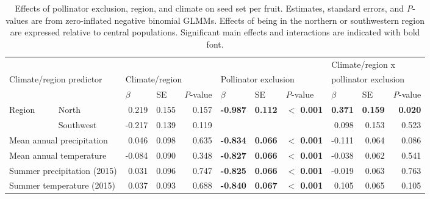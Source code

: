 \documentclass{article}
\begin{document}
\begin{table}[p]
\centering
\caption[Effects of pollinator exclusion, region, and climate on seed set per fruit.]{Effects of pollinator exclusion, region, and climate on seed set per fruit. Estimates, standard errors, and \textit{P}-values are from zero-inflated negative binomial GLMMs. Effects of being in the northern or southwestern region are expressed relative to central populations. Significant main effects and interactions are indicated with bold font.}
\label{seedstable}
\small
\begin{tabular}{llrrrrrrrrr}
\toprule
                            &                     &  & &                        &  &  &   & \multicolumn{3}{l}{Climate/region x}           \\
\multicolumn{2}{l}{Climate/region predictor}          & \multicolumn{3}{l}{Climate/region} &    \multicolumn{3}{l}{Pollinator exclusion}                               & \multicolumn{3}{l}{pollinator exclusion} \\
                            &                     & \multicolumn{1}{l}{$\beta$} & \multicolumn{1}{l}{SE} & \multicolumn{1}{l}{\textit{P}-value} &  \multicolumn{1}{l}{$\beta$}  & \multicolumn{1}{l}{SE} &  \multicolumn{1}{l}{\textit{P}-value} &  \multicolumn{1}{l}{$\beta$}  & \multicolumn{1}{l}{SE} &  \multicolumn{1}{l}{\textit{P}-value} \\
\midrule
Region     & North               & 0.219    & 0.155    & 0.157       & \textbf{-0.987} & \textbf{0.112} & \textbf{$<$ 0.001} & \textbf{0.371} & \textbf{0.159} & \textbf{0.020} \\
                            & Southwest           & -0.217   & 0.139    & 0.119       &        &       &                         & 0.098        & 0.153      & 0.523        \\
\midrule
\multicolumn{2}{l}{Mean annual precipitation}     & 0.046    & 0.098    & 0.635       & \textbf{-0.834} & \textbf{0.066} & \textbf{$<$ 0.001}               & -0.111       & 0.064      & 0.086        \\
\multicolumn{2}{l}{Mean annual temperature}       & -0.084   & 0.090    & 0.348       & \textbf{-0.827} & \textbf{0.066} & \textbf{$<$ 0.001}               & -0.038       & 0.062      & 0.541        \\
\multicolumn{2}{l}{Summer precipitation (2015)}   & 0.031    & 0.096    & 0.747       & \textbf{-0.825} & \textbf{0.066} & \textbf{$<$ 0.001}               & -0.019       & 0.063      & 0.763        \\
\multicolumn{2}{l}{Summer temperature (2015)}     & 0.037    & 0.093    & 0.688       & \textbf{-0.840} & \textbf{0.067} & \textbf{$<$ 0.001}               & 0.105        & 0.065      & 0.105        \\
\bottomrule
\end{tabular}
\end{table}
\end{document}
